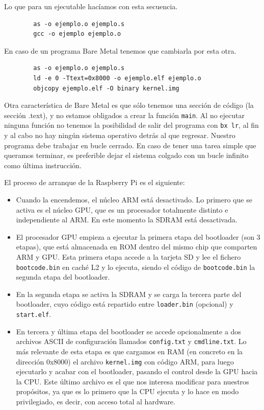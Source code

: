 Lo que para un ejecutable hacíamos con esta secuencia.
\begin{lstlisting}
        as -o ejemplo.o ejemplo.s
        gcc -o ejemplo ejemplo.o
\end{lstlisting}

En caso de un programa Bare Metal tenemos que cambiarla por esta otra.
\begin{lstlisting}
        as -o ejemplo.o ejemplo.s
        ld -e 0 -Ttext=0x8000 -o ejemplo.elf ejemplo.o
        objcopy ejemplo.elf -O binary kernel.img
\end{lstlisting}

Otra característica de Bare Metal es que sólo tenemos una sección de código (la sección
.text), y no estamos obligados a crear la función
{\tt main}. Al no ejecutar ninguna función no tenemos la posibilidad de salir del
programa con {\tt bx lr}, al fin y al cabo no hay ningún sistema operativo detrás al
que regresar. Nuestro programa debe trabajar en bucle cerrado. En caso de tener una
tarea simple que queramos terminar, es preferible dejar el sistema colgado con un
bucle infinito como última instrucción.

El proceso de arranque de la Raspberry Pi es el siguiente:

\begin{itemize}
  \item Cuando la encendemos, el núcleo ARM está desactivado. Lo primero que se activa es el
        núcleo GPU, que es un procesador totalmente distinto e independiente al ARM. En este
        momento la SDRAM está desactivada.
  \item El procesador GPU empieza a ejecutar la primera etapa del bootloader (son 3 etapas), que
        está almacenada en ROM dentro del mismo chip que comparten ARM y GPU. Esta primera etapa
        accede a la tarjeta SD y lee el fichero {\tt bootcode.bin} en caché L2 y lo ejecuta,
        siendo el código de {\tt bootcode.bin} la segunda etapa del bootloader.
  \item En la segunda etapa se activa la SDRAM y se carga la tercera parte del bootloader, cuyo
        código está repartido entre {\tt loader.bin} (opcional) y {\tt start.elf}.
  \item En tercera y última etapa del bootloader se accede opcionalmente a dos archivos ASCII de
        configuración llamados {\tt config.txt} y {\tt cmdline.txt}. Lo más relevante de esta
        etapa es que cargamos en RAM (en concreto en la dirección 0x8000) el archivo
        {\tt kernel.img} con código ARM, para luego ejecutarlo y acabar con el bootloader, pasando
        el control desde la GPU hacia la CPU.
        Este último archivo es el que nos interesa modificar para nuestros propósitos, ya que es
        lo primero que la CPU ejecuta y lo hace en modo privilegiado, es decir, con acceso total
        al hardware.
\end{itemize}

